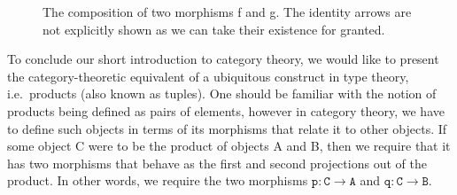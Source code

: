 \documentclass[12pt,twoside,maitrise]{dms}
\theoremstyle{definition}
\numberwithin{equation}{section}
\numberwithin{table}{chapter}
\numberwithin{figure}{chapter}
\newcommand\id[1] {\texttt{#1}}
\begin{document}
\begin{figure}[H]

\caption{The composition of two morphisms f and g. The identity arrows are not explicitly shown as we can take their existence for granted.}

\end{figure}

To conclude our short introduction to category theory, we would like to present
the category-theoretic equivalent of a ubiquitous construct in type theory,
i.e.\ products (also known as tuples). One should be familiar with the notion of
products being defined as pairs of elements, however in category theory, we have
to define such objects in terms of its morphisms that relate it to other
objects. If some object C were to be the product of objects A and B, then we
require that it has two morphisms that behave as the first and second
projections out of the product. In other words, we require the two morphisms
$\id{p} : \id{C} \rightarrow \id{A}$ and $\id{q} : \id{C} \rightarrow \id{B}$.
\end{document}

